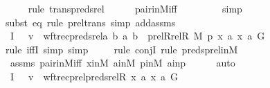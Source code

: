 \begin{isabellebody}
\ \ \ \ \isamarkupfalse%
{\isacharparenleft}{\kern0pt}rule\ trans{\isacharunderscore}{\kern0pt}preds{\isacharunderscore}{\kern0pt}rel{\isacharparenright}{\kern0pt}\isanewline
\ \ \ \ \isamarkupfalse%
\ pair{\isacharunderscore}{\kern0pt}in{\isacharunderscore}{\kern0pt}M{\isacharunderscore}{\kern0pt}iff\ \isanewline
\ \ \ \ \ \ \isamarkupfalse%
\ simp\isanewline
\ \ \ \ \ \isamarkupfalse%
{\isacharparenleft}{\kern0pt}subst\ eq{}{\isacharcomma}{\kern0pt}\ rule\ prel{\isacharunderscore}{\kern0pt}trans{\isacharcomma}{\kern0pt}\ simp\ add{\isacharcolon}{\kern0pt}assms{\isacharparenright}{\kern0pt}\isanewline
\ \ \ \ \isamarkupfalse%
\ \ \ \ \isanewline
\isanewline
\ \ \isamarkupfalse%
\ I{}{\isacharcolon}{\kern0pt}\ {\isachardoublequoteopen}{\isachardot}{\kern0pt}{\isachardot}{\kern0pt}{\isachardot}{\kern0pt}\ {\isasymlongleftrightarrow}\ v\ {\isacharequal}{\kern0pt}\ wftrec{\isacharparenleft}{\kern0pt}preds{\isacharunderscore}{\kern0pt}rel{\isacharparenleft}{\kern0pt}{\isasymlambda}a\ b{\isachardot}{\kern0pt}\ {\isacharless}{\kern0pt}a{\isacharcomma}{\kern0pt}\ b{\isachargreater}{\kern0pt}\ {\isasymin}\ prel{\isacharparenleft}{\kern0pt}Rrel{\isacharparenleft}{\kern0pt}R{\isacharcomma}{\kern0pt}\ M{\isacharparenright}{\kern0pt}{\isacharcomma}{\kern0pt}\ p{\isacharparenright}{\kern0pt}{\isacharcomma}{\kern0pt}\ {\isacharless}{\kern0pt}x{\isacharcomma}{\kern0pt}\ a{\isachargreater}{\kern0pt}{\isacharparenright}{\kern0pt}{\isacharcomma}{\kern0pt}\ {\isacharless}{\kern0pt}x{\isacharcomma}{\kern0pt}\ a{\isachargreater}{\kern0pt}{\isacharcomma}{\kern0pt}\ G{\isacharparenright}{\kern0pt}{\isachardoublequoteclose}\ \isanewline
\ \ \ \ \isamarkupfalse%
{\isacharparenleft}{\kern0pt}rule\ iffI{\isacharcomma}{\kern0pt}\ simp{\isacharcomma}{\kern0pt}\ simp{\isacharparenright}{\kern0pt}\isanewline
\ \ \ \ \isamarkupfalse%
{\isacharparenleft}{\kern0pt}rule\ conjI{\isacharcomma}{\kern0pt}\ rule\ preds{\isacharunderscore}{\kern0pt}prel{\isacharunderscore}{\kern0pt}in{\isacharunderscore}{\kern0pt}M{\isacharparenright}{\kern0pt}\isanewline
\ \ \ \ \isamarkupfalse%
\ assms\ pair{\isacharunderscore}{\kern0pt}in{\isacharunderscore}{\kern0pt}M{\isacharunderscore}{\kern0pt}iff\ xinM\ ainM\ pinM\ ainp\isanewline
\ \ \ \ \isamarkupfalse%
\ auto\isanewline
\isanewline
\ \ \isamarkupfalse%
\ I{}{\isacharcolon}{\kern0pt}\ {\isachardoublequoteopen}{\isachardot}{\kern0pt}{\isachardot}{\kern0pt}{\isachardot}{\kern0pt}\ {\isasymlongleftrightarrow}\ v\ {\isacharequal}{\kern0pt}\ wftrec{\isacharparenleft}{\kern0pt}prel{\isacharparenleft}{\kern0pt}preds{\isacharunderscore}{\kern0pt}rel{\isacharparenleft}{\kern0pt}R{\isacharcomma}{\kern0pt}\ x{\isacharparenright}{\kern0pt}{\isacharcomma}{\kern0pt}\ {\isacharbraceleft}{\kern0pt}a{\isacharbraceright}{\kern0pt}{\isacharparenright}{\kern0pt}{\isacharcomma}{\kern0pt}\ {\isacharless}{\kern0pt}x{\isacharcomma}{\kern0pt}\ a{\isachargreater}{\kern0pt}{\isacharcomma}{\kern0pt}\ G{\isacharparenright}{\kern0pt}{\isachardoublequoteclose}\ \isamarkupfalse%

\end{isabellebody}
